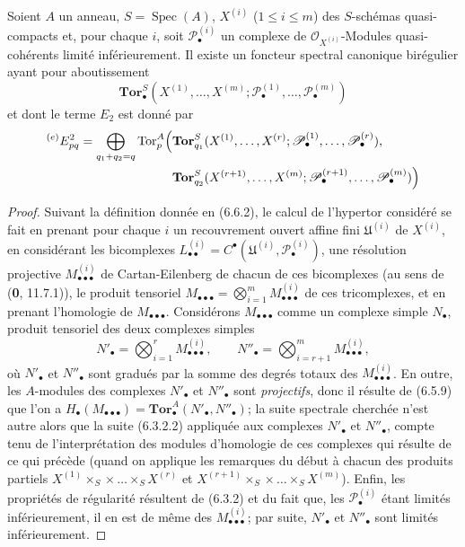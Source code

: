 \begin{corollary}[6.8.3]
Soient $A$ un anneau, $S=\operatorname{Spec}(A)$, $X^{(i)}$
($1\leq i\leq m$) des $S$-schémas quasi-compacts et, pour chaque $i$, soit
$\mathscr P_\bullet^{(i)}$ un complexe de
$\mathscr O_{X^{(i)}}$-Modules quasi-cohérents limité inférieurement. Il
existe un foncteur spectral canonique birégulier ayant pour aboutissement
\[
  \mathbf{Tor}_\bullet^S
  (X^{(1)},\ldots,X^{(m)};
   \mathscr P_\bullet^{(1)},\ldots,\mathscr P_\bullet^{(m)})
\]
et dont le terme $E_2$ est donné par
\[
\begin{split}
  {}^{(e)}E_{pq}^2
  =\bigoplus_{q_1+q_2=q}
  \operatorname{Tor}_p^A\Bigl(
  &\mathbf{Tor}_{q_1}^S
  (X^{(1)},\ldots,X^{(r)};
   \mathscr P_\bullet^{(1)},\ldots,\mathscr P_\bullet^{(r)}),\\
  &\mathbf{Tor}_{q_2}^S
  (X^{(r+1)},\ldots,X^{(m)};
   \mathscr P_\bullet^{(r+1)},\ldots,\mathscr P_\bullet^{(m)})
  \Bigr)
\end{split}
\]
\end{corollary}

\begin{proof}
Suivant la définition donnée en (6.6.2), le calcul de l'hypertor considéré se
fait en prenant pour chaque $i$ un recouvrement ouvert affine fini
$\mathfrak U^{(i)}$ de $X^{(i)}$, en considérant les bicomplexes
$L_{\bullet\bullet}^{(i)}=C^\bullet(\mathfrak U^{(i)},
\mathscr P_\bullet^{(i)})$, une résolution projective
$M_{\bullet\bullet\bullet}^{(i)}$ de Cartan-Eilenberg de chacun de ces
bicomplexes (au sens de (\textbf{0}, 11.7.1)), le produit tensoriel
$M_{\bullet\bullet\bullet}
=\bigotimes_{i=1}^m M_{\bullet\bullet\bullet}^{(i)}$
de ces tricomplexes, et en prenant l'homologie de
$M_{\bullet\bullet\bullet}$. Considérons $M_{\bullet\bullet\bullet}$ comme
un complexe simple $N_\bullet$, produit tensoriel des deux complexes simples
\[
  N'_\bullet=\bigotimes_{i=1}^r M_{\bullet\bullet\bullet}^{(i)},
  \qquad
  N''_\bullet=\bigotimes_{i=r+1}^m M_{\bullet\bullet\bullet}^{(i)},
\]
où $N'_\bullet$ et $N''_\bullet$ sont gradués par la somme des degrés totaux
des $M_{\bullet\bullet\bullet}^{(i)}$. En outre, les $A$-modules des
complexes $N'_\bullet$ et $N''_\bullet$ sont \emph{projectifs}, donc il résulte de
(6.5.9) que l'on a
$H_\bullet(M_{\bullet\bullet\bullet})
=\mathbf{Tor}_\bullet^A(N'_\bullet,N''_\bullet)$;
la suite spectrale cherchée n'est autre alors que la suite (6.3.2.2)
appliquée aux complexes $N'_\bullet$ et $N''_\bullet$, compte tenu de
l'interprétation des modules d'homologie de ces complexes qui résulte de ce
qui précède (quand on applique les remarques du début à chacun des produits
partiels
$X^{(1)}\times_S\times\ldots\times_S X^{(r)}$ et
$X^{(r+1)}\times_S\times\ldots\times_S X^{(m)}$). Enfin, les propriétés de
régularité résultent de (6.3.2) et du fait que, les
$\mathscr P_\bullet^{(i)}$ étant limités inférieurement, il en est de même
des $M_{\bullet\bullet\bullet}^{(i)}$; par suite, $N'_\bullet$ et
$N''_\bullet$ sont limités inférieurement.
\end{proof}

